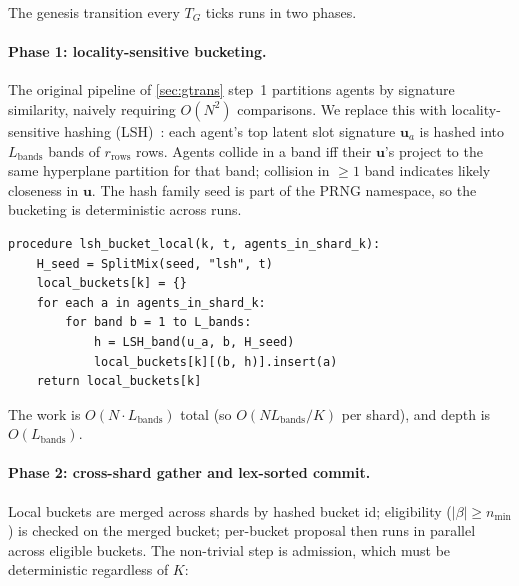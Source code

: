 \documentclass[journal,onecolumn,11pt]{IEEEtran}
\theoremstyle{definition}
\begin{document}
The genesis transition every $T_G$ ticks runs in two phases.

\paragraph{Phase 1: locality-sensitive bucketing.}
The original pipeline of \cref{sec:gtrans} step~1 partitions agents by signature similarity, naively requiring $O(N^2)$ comparisons. We replace this with locality-sensitive hashing (LSH)~\cite{indyk1998}: each agent's top latent slot signature $\mathbf{u}_a$ is hashed into $L_{\mathrm{bands}}$ bands of $r_{\mathrm{rows}}$ rows. Agents collide in a band iff their $\mathbf{u}$'s project to the same hyperplane partition for that band; collision in $\geq 1$ band indicates likely closeness in $\mathbf{u}$. The hash family seed is part of the PRNG namespace, so the bucketing is deterministic across runs.

\begin{verbatim}
procedure lsh_bucket_local(k, t, agents_in_shard_k):
    H_seed = SplitMix(seed, "lsh", t)
    local_buckets[k] = {}
    for each a in agents_in_shard_k:
        for band b = 1 to L_bands:
            h = LSH_band(u_a, b, H_seed)
            local_buckets[k][(b, h)].insert(a)
    return local_buckets[k]
\end{verbatim}

The work is $O(N \cdot L_{\mathrm{bands}})$ total (so $O(N L_{\mathrm{bands}}/K)$ per shard), and depth is $O(L_{\mathrm{bands}})$.

\paragraph{Phase 2: cross-shard gather and lex-sorted commit.}
Local buckets are merged across shards by hashed bucket id; eligibility ($|\beta| \geq n_{\min}$) is checked on the merged bucket; per-bucket proposal then runs in parallel across eligible buckets. The non-trivial step is admission, which must be deterministic regardless of $K$:
\end{document}
